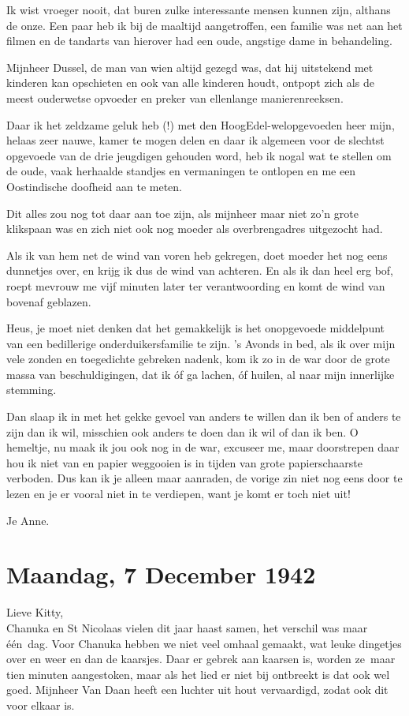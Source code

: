 \documentclass{book}
\begin{document}
Ik wist vroeger nooit, dat buren zulke interessante mensen kunnen zijn, althans
de onze. Een paar heb ik bij de maaltijd aangetroffen, een familie was net aan
het filmen en de tandarts van hierover had een oude, angstige dame in
behandeling.

Mijnheer Dussel, de man van wien altijd gezegd was, dat hij uitstekend met
kinderen kan opschieten en ook van alle kinderen houdt, ontpopt zich als de
meest ouderwetse opvoeder en preker van ellenlange manierenreeksen.

Daar ik het zeldzame geluk heb (!) met den HoogEdel-welopgevoeden heer mijn,
helaas zeer nauwe, kamer te mogen delen en daar ik algemeen voor de slechtst
opgevoede van de drie jeugdigen gehouden word, heb ik nogal wat te stellen om de
oude, vaak herhaalde standjes en vermaningen te ontlopen en me een Oostindische
doofheid aan te meten.

Dit alles zou nog tot daar aan toe zijn, als mijnheer maar niet zo'n grote
klikspaan was en zich niet ook nog moeder als overbrengadres uitgezocht had.

Als ik van hem net de wind van voren heb gekregen, doet moeder het nog eens
dunnetjes over, en krijg ik dus de wind van achteren. En als ik dan heel erg
bof, roept mevrouw me vijf minuten later ter verantwoording en komt de wind van
bovenaf geblazen.

Heus, je moet niet denken dat het gemakkelijk is het onopgevoede middelpunt van
een bedillerige onderduikersfamilie te zijn. 's Avonds in bed, als ik over mijn
vele zonden en toegedichte gebreken nadenk, kom ik zo in de war door de grote
massa van beschuldigingen, dat ik óf ga lachen, óf huilen, al naar mijn
innerlijke stemming.

Dan slaap ik in met het gekke gevoel van anders te willen dan ik ben of anders
te zijn dan ik wil, misschien ook anders te doen dan ik wil of dan ik ben. O
hemeltje, nu maak ik jou ook nog in de war, excuseer me, maar doorstrepen daar
hou ik niet van en papier weggooien is in tijden van grote papierschaarste
verboden. Dus kan ik je alleen maar aanraden, de vorige zin niet nog eens door
te lezen en je er vooral niet in te verdiepen, want je komt er toch niet uit!

Je Anne.

\section*{Maandag, 7 December 1942}

Lieve Kitty,\\
Chanuka en St Nicolaas vielen dit jaar haast samen, het verschil
was maar één~dag. Voor Chanuka hebben we niet veel omhaal gemaakt, wat leuke
dingetjes over en weer en dan de kaarsjes. Daar er gebrek aan kaarsen is, worden
ze~maar tien minuten aangestoken, maar als het lied er niet bij ontbreekt is dat
ook wel goed. Mijnheer Van Daan heeft een luchter uit hout vervaardigd, zodat
ook dit voor elkaar is.
\end{document}
